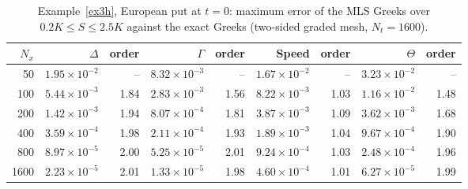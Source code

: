 \begin{table}[htbp]
\centering
\scriptsize
\caption{Example~\ref{ex3h}, European put at $t=0$: maximum error of the MLS Greeks over $0.2K\le S\le2.5K$ against the exact Greeks (two-sided graded mesh, $N_t=1600$).}
\label{tab:greeks}
\begin{tabular}{rrrrrrrrr}
\toprule
$N_x$ & $\Delta$ & order & $\Gamma$ & order & Speed & order & $\Theta$ & order \\
\midrule
50 & $1.95\times10^{-2}$ & -- & $8.32\times10^{-3}$ & -- & $1.67\times10^{-2}$ & -- & $3.23\times10^{-2}$ & -- \\
100 & $5.44\times10^{-3}$ & 1.84 & $2.83\times10^{-3}$ & 1.56 & $8.22\times10^{-3}$ & 1.03 & $1.16\times10^{-2}$ & 1.48 \\
200 & $1.42\times10^{-3}$ & 1.94 & $8.07\times10^{-4}$ & 1.81 & $3.87\times10^{-3}$ & 1.09 & $3.62\times10^{-3}$ & 1.68 \\
400 & $3.59\times10^{-4}$ & 1.98 & $2.11\times10^{-4}$ & 1.93 & $1.89\times10^{-3}$ & 1.04 & $9.67\times10^{-4}$ & 1.90 \\
800 & $8.97\times10^{-5}$ & 2.00 & $5.25\times10^{-5}$ & 2.01 & $9.24\times10^{-4}$ & 1.03 & $2.48\times10^{-4}$ & 1.96 \\
1600 & $2.23\times10^{-5}$ & 2.01 & $1.33\times10^{-5}$ & 1.98 & $4.60\times10^{-4}$ & 1.01 & $6.27\times10^{-5}$ & 1.99 \\
\bottomrule
\end{tabular}
\end{table}
